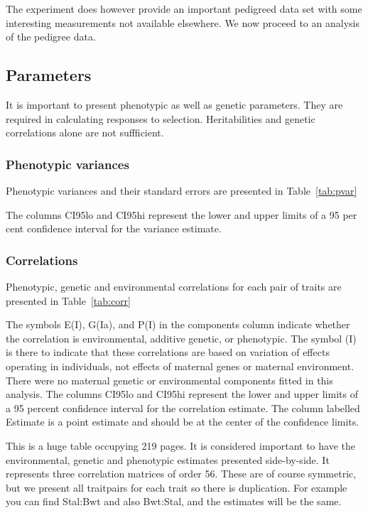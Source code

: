 \documentclass[titlepage]{article}  %
\begin{document}
The experiment does however provide an important pedigreed data set with some interesting measurements not available elsewhere. We now proceed to an analysis of the pedigree data.

\clearpage
\subsection{Parameters}
It is important to present phenotypic as well as genetic parameters. They are required in calculating responses to selection. Heritabilities and genetic correlations alone are not suffficient.

\subsubsection{Phenotypic variances}
Phenotypic variances and their standard errors are presented in Table~\ref{tab:pvar}

The columns CI95lo and CI95hi represent the lower and upper limits of a 95 per
cent confidence interval for the variance estimate.

\subsubsection{Correlations}
Phenotypic, genetic and environmental correlations for each pair of traits are presented in Table~\ref{tab:corr}

The symbols E(I), G(Ia), and P(I) in the components column indicate whether the correlation is environmental, additive genetic, or phenotypic. The symbol (I) is there to indicate that these correlations are based on variation of effects operating in individuals, not effects of maternal genes or maternal environment. There were no maternal genetic or environmental components fitted in this analysis. The columns CI95lo and CI95hi represent the lower and upper limits of a 95 percent confidence interval for the correlation estimate. The column labelled Estimate is a point estimate and should be at the center of the confidence limits.

 This is a huge table occupying 219 pages. It is considered important to have the environmental, genetic and phenotypic estimates presented side-by-side. It represents three correlation matrices of order 56. These are of course symmetric, but we present all traitpairs for each trait so there is duplication. For example you can find Stal:Bwt and also Bwt:Stal, and the estimates will be the same.
\end{document}
